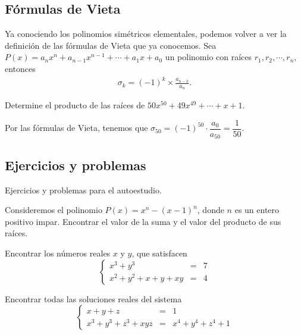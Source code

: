 \subsection{Fórmulas de Vieta}

Ya conociendo los polinomios simétricos elementales, podemos volver a ver la definición de las fórmulas de Vieta que ya conocemos.
Sea $P(x) = a_n x^n + a_{n - 1} x^{n - 1} + \cdots  + a_1 x + a_0$ un polinomio con raíces $r_1, r_2, \cdots, r_n$,
entonces
\begin{gather*}
    \sigma_k = (-1)^k\times \frac{a_{n - k}}{a_n}.
\end{gather*}

\begin{example}
    Determine el producto de las raíces de $50x^{50} + 49x^{49} + \cdots + x + 1.$
\end{example}
\begin{solution}
    Por las fórmulas de Vieta, tenemos que $\sigma_{50} = (-1)^{50} \cdot \dfrac{a_0}{a_{50}} = \dfrac{1}{50}.$
\end{solution}

\subsection{Ejercicios y problemas}

Ejercicios y problemas para el autoestudio.

\begin{problem}
    Consideremos el polinomio $P(x) = x^n - (x - 1)^n$, donde $n$ es un entero positivo impar.
    Encontrar el valor de la suma y el valor del producto de sus raíces.
\end{problem}

\begin{problem}
    Encontrar los números reales $x$ y $y$, que satisfacen
    \[
        \left\{
        \begin{array}{rcl}
            x^3 + y^3              & = & 7 \\
            x^2 + y^2 + x + y + xy & = & 4
        \end{array}
        \right.
    \]
\end{problem}

\begin{problem}
    Encontrar todas las soluciones reales del sistema
    \[
        \left\{
        \begin{array}{rcl}
            x + y + z             & = & 1                   \\
            x^3 + y^3 + z^3 + xyz & = & x^4 + y^4 + z^4 + 1
        \end{array}
        \right.
    \]
\end{problem}

